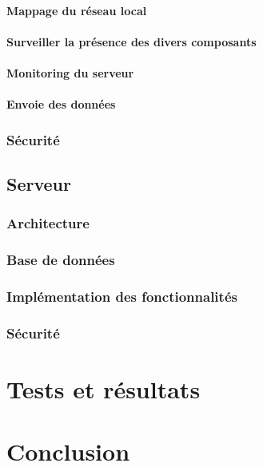 \subsubsection{Mappage du réseau local}


\subsubsection{Surveiller la présence des divers composants}

\subsubsection{Monitoring du serveur}

\subsubsection{Envoie des données}



\subsection{Sécurité}
\newpage
\section{Serveur}

\subsection{Architecture}
\subsection{Base de données}
\subsection{Implémentation des fonctionnalités}
\subsection{Sécurité}

\chapter{Tests et résultats}


\chapter{Conclusion}
